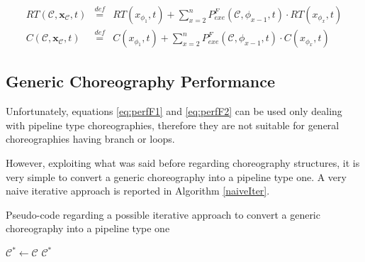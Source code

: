 \documentclass[12pt,a4paper]{report}
\newcommand{\mathDef}{\overset{\textit{def}}{=}}
\begin{document}
\begin{eqnarray}
	RT(\mathcal{C},\textbf{x}_{\mathcal{C}}, t) & \mathDef &  RT(x_{\phi_1},t) + \sum_{x = 2}^n P_{exe}^F(\mathcal{C},\phi_{x-1},t) \cdot RT(x_{\phi_x},t) \label{eq:perfF1} \\
	C(\mathcal{C},\textbf{x}_{\mathcal{C}}, t) & \mathDef &  C(x_{\phi_1},t) + \sum_{x = 2}^n P_{exe}^F(\mathcal{C},\phi_{x-1},t) \cdot C(x_{\phi_x},t) \label{eq:perfF2}
\end{eqnarray}

\subsection{Generic Choreography Performance}

Unfortunately, equations \ref{eq:perfF1} and \ref{eq:perfF2} can be used only dealing with pipeline type choreographies, therefore they are not suitable for general choreographies having branch or loops. 

However, exploiting what was said before regarding choreography structures, it is very simple to convert a generic choreography into a pipeline type one. A very naive iterative approach is reported in Algorithm \ref{naiveIter}.

\begin{algorithm}\caption{Pseudo-code regarding a possible iterative approach to convert a generic choreography into a pipeline type one}\label{naiveIter}
	
	$\mathcal{C}^* \leftarrow \mathcal{C}$\;
	\Return $\mathcal{C}^*$
\end{algorithm}
\end{document}
